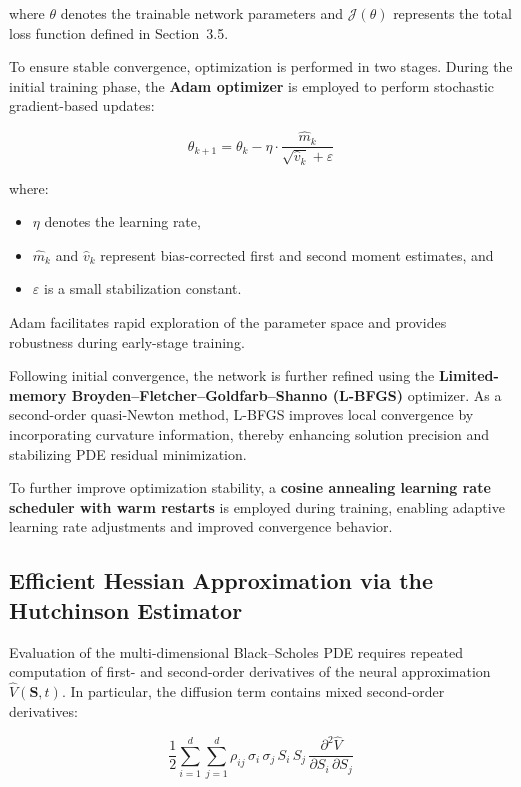 \documentclass[12pt, a4paper]{article}
\begin{document}
where $\theta$ denotes the trainable network parameters and
$\mathcal{J}(\theta)$ represents the total loss function defined in
Section~3.5.

To ensure stable convergence, optimization is performed in two stages.
During the initial training phase, the \textbf{Adam optimizer} is
employed to perform stochastic gradient-based updates:

\begin{equation}
    \theta_{k+1} = \theta_k - \eta \cdot
    \frac{\hat{m}_k}{\sqrt{\hat{v}_k} + \varepsilon}
    \label{eq:adam}
\end{equation}

where:
\begin{itemize}
    \item $\eta$ denotes the learning rate,
    \item $\hat{m}_k$ and $\hat{v}_k$ represent bias-corrected first
          and second moment estimates, and
    \item $\varepsilon$ is a small stabilization constant.
\end{itemize}

Adam facilitates rapid exploration of the parameter space and provides
robustness during early-stage training.

Following initial convergence, the network is further refined using the
\textbf{Limited-memory Broyden--Fletcher--Goldfarb--Shanno (L-BFGS)}
optimizer. As a second-order quasi-Newton method, L-BFGS improves local
convergence by incorporating curvature information, thereby enhancing
solution precision and stabilizing PDE residual minimization.

To further improve optimization stability, a \textbf{cosine annealing
learning rate scheduler with warm restarts} is employed during training,
enabling adaptive learning rate adjustments and improved convergence
behavior.

\subsection{Efficient Hessian Approximation via the Hutchinson Estimator}

Evaluation of the multi-dimensional Black--Scholes PDE requires repeated
computation of first- and second-order derivatives of the neural
approximation $\hat{V}(\mathbf{S},t)$. In particular, the diffusion
term contains mixed second-order derivatives:

\begin{equation}
    \frac{1}{2}\sum_{i=1}^{d}\sum_{j=1}^{d}
    \rho_{ij}\,\sigma_i\,\sigma_j\,S_i\,S_j\,
    \frac{\partial^2\hat{V}}{\partial S_i\,\partial S_j}
    \label{eq:diffusion_term}
\end{equation}
\end{document}

